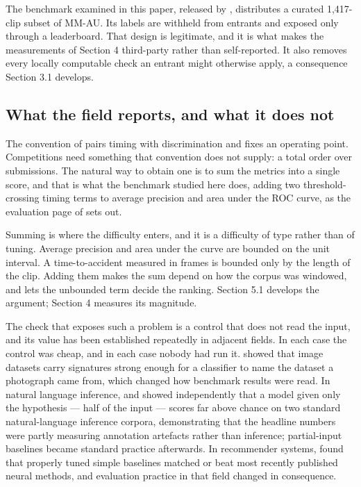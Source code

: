The benchmark examined in this paper, released by \citet{autopilot2026}, distributes a curated 1,417-clip subset of MM-AU. Its labels are withheld from entrants and exposed only through a leaderboard. That design is legitimate, and it is what makes the measurements of Section 4 third-party rather than self-reported. It also removes every locally computable check an entrant might otherwise apply, a consequence Section 3.1 develops.

\subsection{What the field reports, and what it does not}
The convention of \citet{karim2022dsta} pairs timing with discrimination and fixes an operating point. Competitions need something that convention does not supply: a total order over submissions. The natural way to obtain one is to sum the metrics into a single score, and that is what the benchmark studied here does, adding two threshold-crossing timing terms to average precision and area under the ROC curve, as the evaluation page of \citet{autopilot2026} sets out.

Summing is where the difficulty enters, and it is a difficulty of type rather than of tuning. Average precision and area under the curve are bounded on the unit interval. A time-to-accident measured in frames is bounded only by the length of the clip. Adding them makes the sum depend on how the corpus was windowed, and lets the unbounded term decide the ranking. Section 5.1 develops the argument; Section 4 measures its magnitude.

The check that exposes such a problem is a control that does not read the input, and its value has been established repeatedly in adjacent fields. In each case the control was cheap, and in each case nobody had run it. \citet{torralba2011bias} showed that image datasets carry signatures strong enough for a classifier to name the dataset a photograph came from, which changed how benchmark results were read. In natural language inference, \citet{gururangan2018artifacts} and \citet{poliak2018hypothesis} showed independently that a model given only the hypothesis --- half of the input --- scores far above chance on two standard natural-language inference corpora, demonstrating that the headline numbers were partly measuring annotation artefacts rather than inference; partial-input baselines became standard practice afterwards. In recommender systems, \citet{ferraridacrema2019progress} found that properly tuned simple baselines matched or beat most recently published neural methods, and evaluation practice in that field changed in consequence.

